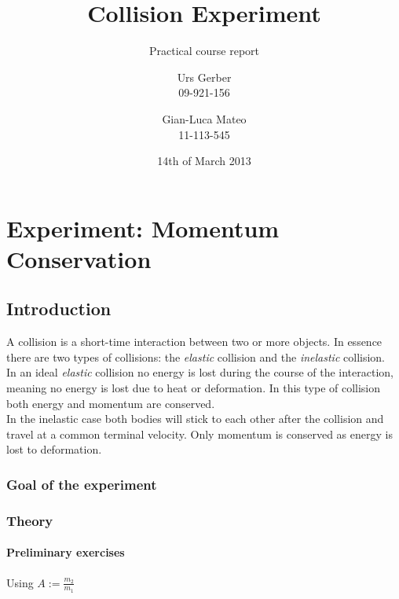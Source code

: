 \documentclass{scrreprt}
\author{Urs Gerber\\09-921-156 \and Gian-Luca Mateo\\11-113-545}
\date{14th of March 2013}
\title{Collision Experiment}
\subtitle{Practical course report}
\renewcommand{\emph}[1]{\textit{#1}}
\begin{document}
\maketitle

\tableofcontents
\newpage

\chapter{Experiment: Momentum Conservation}
\section{Introduction}
A collision is a short-time interaction between two or more objects. In essence there are two types of collisions: the \emph{elastic} collision and the \emph{inelastic} collision.\\
In an ideal \emph{elastic} collision no energy is lost during the course of the interaction, meaning no energy is lost due to heat or deformation. In this type of collision both energy and momentum are conserved.\\
In the inelastic case both bodies will stick to each other after the collision and travel at a common terminal velocity. Only momentum is conserved as energy is lost to deformation.
 
\subsection{Goal of the experiment}

\subsection{Theory}
\subsubsection{Preliminary exercises}
Using $A:=\frac{m_2}{m_1}$
\end{document}
